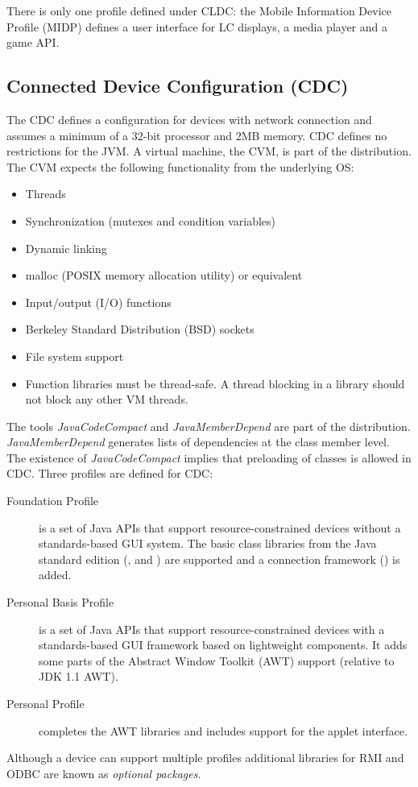 There is only one profile defined under CLDC: the Mobile Information
Device Profile (MIDP) defines a user interface for LC displays,
a media player and a game API.

\subsection{Connected Device Configuration (CDC)}

The CDC defines a configuration for devices with network connection
and assumes a minimum of a 32-bit processor and 2MB memory. CDC
defines no restrictions for the JVM. A virtual machine, the CVM, is
part of the distribution. The CVM expects the following
functionality from the underlying OS:
%
\begin{itemize}
    \item Threads
    \item Synchronization (mutexes and condition variables)
    \item Dynamic linking
    \item malloc (POSIX memory allocation utility) or equivalent
    \item Input/output (I/O) functions
    \item Berkeley Standard Distribution (BSD) sockets
    \item File system support
    \item Function libraries must be thread-safe. A thread blocking in a library should not block any other VM threads.
\end{itemize}
%
The tools \textit{JavaCodeCompact} and \textit{JavaMemberDepend} are
part of the distribution. \textit{JavaMemberDepend} generates lists
of dependencies at the class member level. The existence of
\textit{JavaCodeCompact} implies that preloading of classes is
allowed in CDC. Three profiles are defined for CDC:
%
\begin{description}
    \item[Foundation Profile] is a set of Java APIs that support resource-constrained
devices without a standards-based GUI system. The basic class
libraries from the Java standard edition (,
 and ) are supported and a connection
framework () is added.

    \item[Personal Basis Profile] is a set of Java APIs that support
resource-constrained devices with a standards-based GUI framework
based on lightweight components. It adds some parts of the Abstract
Window Toolkit (AWT) support (relative to JDK 1.1 AWT).

    \item[Personal Profile] completes the AWT libraries and includes support for the
applet interface.

\end{description}
%
Although a device can support multiple profiles additional libraries
for RMI and ODBC are known as \textit{optional packages}.

